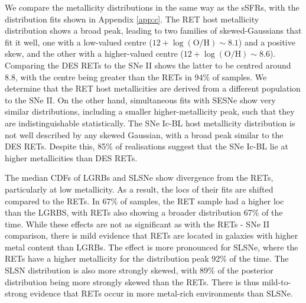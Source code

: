 \documentclass[fleqn,usenatbib,]{mnras}
\newcommand{\replyref}[1]{\color{magenta}#1 \color{black}}
\begin{document}
We compare the metallicity distributions in the same way as the sSFRs, with the distribution fits shown in Appendix \ref{app:c}. The RET host metallicity distribution shows a broad peak, leading to two families of skewed-Gaussians that fit it well, one with a low-valued centre  ($12 + \log \mathrm{(O/H)} \sim 8.1$) and a positive skew, and the other with a higher-valued centre ($12 + \log \mathrm{(O/H)} \sim 8.6$). Comparing the DES RETs to the \citet{Stoll2013} SNe II shows the latter to be centred around 8.8, with the centre being greater than the RETs in 94\% of samples. We determine that the RET host metallicities are derived from a different population to the SNe II. On the other hand, simultaneous fits with SESNe show very similar distributions, including a smaller higher-metallicity peak, such that they are indistinguishable statistically. \replyref{The SNe Ic-BL host metallicity distribution is not well described by any skewed Gaussian, with a broad peak similar to the DES RETs. Despite this, 85\% of realisations suggest that the SNe Ic-BL lie at higher metallicities than DES RETs.}

The median CDFs of LGRBs and SLSNe show divergence from the RETs, particularly at low metallicity. As a result, the locs of their fits are shifted compared to the RETs. In 67\% of samples, the RET sample had a higher loc than the LGRBS, with RETs also showing a broader distribution 67\% of the time. While these effects are not as significant as with the RETs - SNe II comparison, there is mild evidence that RETs are located in galaxies with higher metal content than LGRBs. The effect is more pronounced for SLSNe, where the RETs have a higher metallicity for the distribution peak 92\% of the time. The SLSN distribution is also more strongly skewed, with 89\% of the posterior distribution being more strongly skewed than the RETs. There is thus mild-to-strong evidence that RETs occur in more metal-rich environments than SLSNe. 
\end{document}

